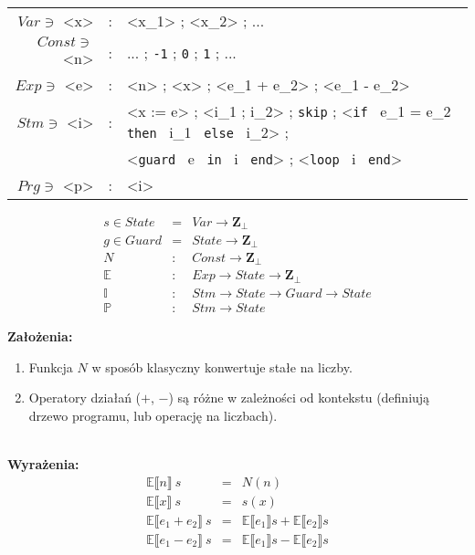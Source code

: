 \documentclass[a4paper,11pt]{article}
\begin{document}
\begin{grammar}
  [(colon){$::=$}]
  [(period){.}]
  [(semicolon){$|$}]
  [(quote){\begin{bf}}{\end{bf}}]
  [(nonterminal){$}{$}]
\begin{tabular}{ r c l }
  $Var \ni$ <x> & : & <x_1> ; <x_2> ; ... \\
  $Const \ni$ <n> & : &  ... ; \texttt{-1} ; \texttt{0} ; \texttt{1} ; ... \\
  $Exp \ni$ <e> & : & <n> ; <x> ; <e_1 + e_2> ; <e_1 - e_2> \\
  $Stm \ni$ <i> & : & <x := e> ; <i_1 ; i_2> ; \texttt{skip} ;
	<\texttt{if } e_1  = e_2 \texttt{ then } i_1 \texttt{ else } i_2> ; \\
	& & <\texttt{guard } e \texttt{ in } i \texttt{ end}> ;
	<\texttt{loop } i \texttt{ end}> \\
  $Prg \ni$ <p> & : & <i>
\end{tabular}
\end{grammar}

\begin{eqnarray*}
s \in State & = & Var \to \mathbf{Z_{\perp}} \\
g \in Guard & = & State \to \mathbf{Z_{\perp}} \\
N & : & Const \to \mathbf{Z_{\perp}}\\
\mathbb{E} & : & Exp \to State \to \mathbf{Z_{\perp}} \\
\mathbb{I} & : & Stm \to State \to Guard \to State \\
\mathbb{P} & : & Stm \to State
\end{eqnarray*} 

{\bf Założenia:}
\begin{enumerate}
  \item{Funkcja $N$ w sposób klasyczny konwertuje stałe na liczby.}
  \item{Operatory działań ($+$, $-$) są różne w zależności od kontekstu (definiują drzewo programu, lub operację na liczbach).}
\end{enumerate}
\ \\

{\bf Wyrażenia:}
\begin{eqnarray*}
  \mathbb{E} \llbracket n \rrbracket \ s & = & N(n) \\
  \mathbb{E} \llbracket x \rrbracket \ s & = & s(x)\\
  \mathbb{E} \llbracket e_1 + e_2 \rrbracket \ s & = & \mathbb{E} \llbracket e_1 \rrbracket s + \mathbb{E} \llbracket e_2 \rrbracket s \\
  \mathbb{E} \llbracket e_1 - e_2 \rrbracket \ s & = & \mathbb{E} \llbracket e_1 \rrbracket s - \mathbb{E} \llbracket e_2 \rrbracket s
\end{eqnarray*}
\end{document}
